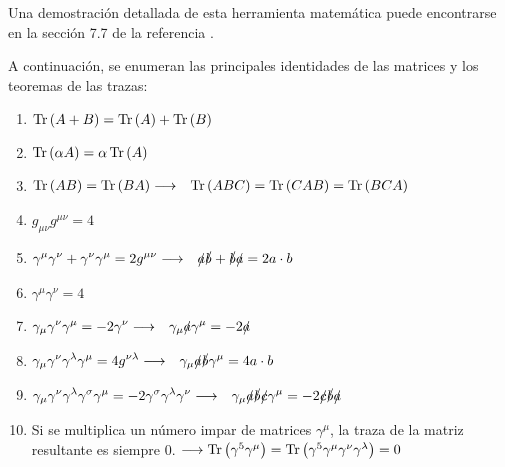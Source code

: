 Una demostración detallada de esta herramienta matemática puede encontrarse en la sección 7.7 de la referencia \cite{Griffiths2008}.

A continuación, se enumeran las principales identidades de las matrices y los teoremas de las trazas:

\begin{enumerate}
\setlength{\itemsep}{0.2\baselineskip}
\item $\operatorname{Tr} \left(A+B\right)=\operatorname{Tr}\left( A\right)+\operatorname{Tr}\left( B\right)$
\item $\operatorname{Tr}\left( \alpha A\right) =\alpha \operatorname{Tr}\left( A\right)$
\item $\begin{aligned}[t]
\operatorname{Tr}\left(AB\right) &= \operatorname{Tr}\left( BA\right) \longrightarrow & \operatorname{Tr}\left( ABC\right) &=\operatorname{Tr}\left( CAB\right) =\operatorname{Tr}\left( BCA\right)
\end{aligned}$
\item $g_{\mu\nu}g^{\mu\nu}=4$
\item $\begin{aligned}[t]
\gamma ^{\mu }\gamma ^{\nu }+\gamma ^{\nu }\gamma ^{\mu } &= 2g^{\mu \nu } \longrightarrow & \slashed{a}\slashed{b}+\slashed{b}\slashed{a}&=2a\cdot b
\end{aligned}$
\item $\gamma ^{\mu }\gamma ^{\nu }=4$
\item $\begin{aligned}[t]
\gamma _{\mu }\gamma ^{\nu }\gamma ^{\mu } &= -2\gamma ^{\nu } \longrightarrow & \gamma _{\mu }\slashed{a}\gamma^{\mu } &= -2\slashed{a}
\end{aligned}$
\item $\begin{aligned}[t] 
\gamma _{\mu }\gamma ^{\nu }\gamma ^{\lambda }\gamma ^{\mu }&= 4g^{\nu\lambda } \longrightarrow & \gamma _{\mu }\slashed{a}\slashed{b}\gamma ^{\mu} &= 4a\cdot b \end{aligned}$
\item $\begin{aligned}[t] 
\gamma _{\mu }\gamma ^{\nu }\gamma ^{\lambda }\gamma ^{\sigma}\gamma ^{\mu }&=-2\gamma^{\sigma}\gamma ^{\lambda}\gamma ^{\nu} \longrightarrow & \gamma _{\mu }\slashed{a}\slashed{b}\slashed{c}\gamma ^{\mu} &= -2\slashed{c}\slashed{b}\slashed{a}\end{aligned}$
\item Si se multiplica un número impar de matrices $\gamma^{\mu}$, la traza de la matriz resultante es siempre 0. $ \longrightarrow \operatorname{Tr}\left( \gamma ^{5}\gamma ^{\mu }\right) =\operatorname{Tr}\left( \gamma ^{5}\gamma ^{\mu }\gamma ^{\nu }\gamma ^{\lambda }\right) =0$

\end{enumerate}
